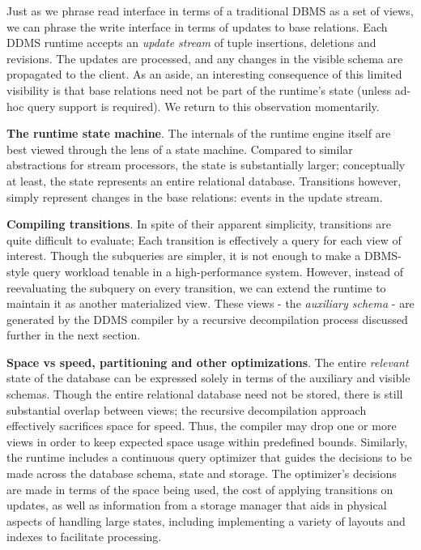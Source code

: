 Just as we phrase read interface in terms of a traditional DBMS as a set of views, we can phrase the write interface in terms of updates to base relations.  Each DDMS runtime accepts an \textit{update stream} of tuple insertions, deletions and revisions.  The updates are processed, and any changes in the visible schema are propagated to the client.  As an aside, an interesting consequence of this limited visibility is that base relations need not be part of the runtime's state (unless ad-hoc query support is required).  We return to this observation momentarily.

{\bf The runtime state machine}\/.
The internals of the runtime engine itself are best viewed through the lens of a state machine.  Compared to similar abstractions for stream processors\cite{demers-sigmod:07}, the state is substantially larger; conceptually at least, the state represents an entire relational database.  Transitions however, simply represent changes in the base relations: events in the update stream.

{\bf Compiling transitions}\/.
In spite of their apparent simplicity, transitions are quite difficult to evaluate; Each transition is effectively a query for each view of interest.  Though the subqueries are simpler, it is not enough to make a DBMS-style query workload tenable in a high-performance system.  However, instead of reevaluating the subquery on every transition, we can extend the runtime to maintain it as another materialized view.  These views - the \textit{auxiliary schema} - are generated by the DDMS compiler by a recursive decompilation process discussed further in the next section.  

{\bf Space vs speed, partitioning and other optimizations}\/.
The entire \textit{relevant} state of the database can be expressed solely in terms of the auxiliary and visible schemas.  Though the entire relational database need not be stored, there is still substantial overlap between views; the recursive decompilation approach effectively sacrifices space for speed.  Thus, the compiler may drop one or more views in order to keep expected space usage within predefined bounds.  Similarly, the runtime includes a continuous query optimizer that guides the decisions to be made across the database schema, state and storage.  The optimizer's decisions are made in terms of the space being used, the cost of applying transitions on updates, as well as information from a storage manager that aids in physical aspects of handling large states, including implementing a variety of layouts and indexes to facilitate processing.\